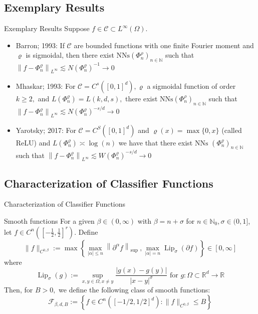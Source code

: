 \documentclass{if-beamer}
\begin{document}
\subsection{Exemplary Results}
\begin{frame}{Exemplary Results}
    Suppose $f \in \mathcal{C} \subset L^{\infty}(\Omega)$.
    \begin{itemize}
        \item Barron; 1993: If $\mathcal{C}$ are bounded functions with one finite Fourier moment and $\varrho$ is sigmoidal, then there exist $\mathrm{NNs}\left(\Phi_{n}^{\rho}\right)_{n \in \mathbb{N}}$ such that $\left\|f-\Phi_{n}^{\varrho}\right\|_{L^{\infty}} \lesssim N\left(\Phi_{n}^{\varrho}\right)^{-1} \rightarrow 0$
        \item Mhaskar; 1993: For $\mathcal{C}=C^{s}\left([0,1]^{d}\right), \varrho$ a sigmoidal function of order $k \geq 2,$ and $L\left(\Phi_{n}^{\varrho}\right)=L(k, d, s),$ there exist $\mathrm{NNs}\left(\Phi_{n}^{\rho}\right)_{n \in \mathbb{N}}$ such that $\left\|f-\Phi_{n}^{\varrho}\right\|_{L^{\infty}} \lesssim N\left(\Phi_{n}^{\varrho}\right)^{-s / d} \rightarrow 0$
        \item Yarotsky; 2017: For $\mathcal{C}=C^{S}\left([0,1]^{d}\right)$ and $\varrho(x)=\max \{0, x\}$
        (called ReLU) and $L\left(\Phi_{n}^{\varrho}\right) \asymp \log (n)$ we have that there exist $\mathrm{NNs}$
        $\left(\Phi_{n}^{\varrho}\right)_{n \in \mathbb{N}}$ such that $\left\|f-\Phi_{n}^{\varrho}\right\|_{L^{\infty}} \lesssim W\left(\Phi_{n}^{\varrho}\right)^{-s / d} \rightarrow 0$
    \end{itemize}
\end{frame}

\subsection{Characterization of Classifier Functions}
\begin{frame}{Characterization of Classifier Functions}
    \begin{block}{Smooth functions}
        For a given $\beta \in (0,\infty)$ with $\beta = n + \sigma$ for $n \in \mathbb{N}_0, \sigma \in (0,1]$, let $f \in C^n([-\frac{1}{2}, \frac{1}{2}]^r)$. Define $$\|f\|_{C^{0, \beta}}:=\max \left\{\max _{|\alpha| \leq n}\left\|\partial^{\alpha} f\right\|_{\text {sup }}, \max _{|\alpha|=n} \operatorname{Lip}_{\sigma}(\partial f)\right\} \in[0, \infty] $$
        where \[
        \operatorname{Lip}_{\sigma}(g):=\sup _{x, y \in \Omega, x \neq y} \frac{|g(x)-g(y)|}{|x-y|^{\sigma}} \text { for } g: \Omega \subset \mathbb{R}^{d} \rightarrow \mathbb{R}
        \]
        Then, for $B>0,$ we define the following class of smooth functions:
        \[
        \mathcal{F}_{\beta, d, B}:=\left\{f \in C^{n}\left([-1 / 2,1 / 2]^{d}\right):\|f\|_{C^{0, \beta}} \leq B\right\}
        \]
    \end{block}
    
\end{frame}
\end{document}
